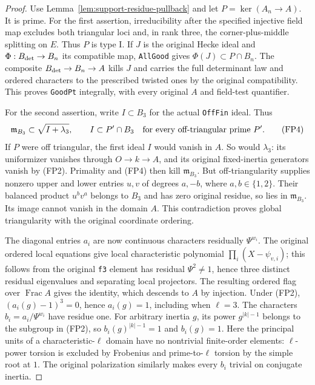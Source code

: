 \begin{proof}
Use Lemma~\ref{lem:support-residue-pullback} and let
$P=\ker(A_n\to A)$.  It is prime.  For the first assertion,
irreducibility after the specified injective field map excludes
both triangular loci and, in rank three, the corner-plus-middle
splitting on $E$.  Thus $P$ is type I.  If $J$ is the original
Hecke ideal and $\Phi:B_{\rm det}\to B_n$ its compatible map,
\texttt{AllGood} gives
$\Phi(J)\subset P\cap B_n$.  The composite
$B_{\rm det}\to B_n\to A$ kills $J$ and carries the full determinant
law and ordered characters to the prescribed twisted ones by the
original compatibility.  This proves \texttt{GoodPt} integrally,
with every original $A$ and field-test quantifier.

For the second assertion, write $I\subset B_3$ for the actual
\texttt{OffFin} ideal.  Thus
\[
 \mathfrak m_{B_3}\subset\sqrt{I+\lambda_3},\qquad
 I\subset P'\cap B_3\quad\hbox{for every off-triangular prime }P'.
                                                               \tag{FP4}
\]
If $P$ were off triangular, the first ideal $I$ would vanish in $A$.
So would $\lambda_3$: its uniformizer vanishes through $O\to k\to A$,
and its original fixed-inertia generators vanish by (FP2).
Primality and (FP4) then kill $\mathfrak m_{B_3}$.
But off-triangularity supplies nonzero upper and lower entries
$u,v$ of degrees $a,-b$, where $a,b\in\{1,2\}$.
Their balanced product $u^bv^a$ belongs to $B_3$ and has zero
original residue, so lies in $\mathfrak m_{B_3}$.
Its image cannot vanish in the domain $A$.  This contradiction
proves global triangularity with the original coordinate ordering.

The diagonal entries $a_i$ are now continuous characters residually
$\Psi^{w_i}$.  The original ordered local equations give local
characteristic polynomial $\prod_i(X-\psi_{v,i})$; this follows from
the original \texttt{f3} element has residual $\Psi^2\ne1$, hence
three distinct residual eigenvalues and separating local projectors.
The resulting ordered flag over $\operatorname{Frac}A$ gives the identity,
which descends to $A$ by injection.  Under (FP2),
$(a_i(g)-1)^3=0$, hence $a_i(g)=1$, including when $\ell=3$.
The characters $b_i=a_i/\Psi^{w_i}$ have residue one.
For arbitrary inertia $g$, its power $g^{|k|-1}$ belongs to the
subgroup in (FP2), so $b_i(g)^{|k|-1}=1$ and $b_i(g)=1$.
Here the principal units of a characteristic-$\ell$ domain have
no nontrivial finite-order elements: $\ell$-power torsion is
excluded by Frobenius and prime-to-$\ell$ torsion by the simple
root at $1$.  The original polarization similarly makes every
$b_i$ trivial on conjugate inertia.


\end{proof}
